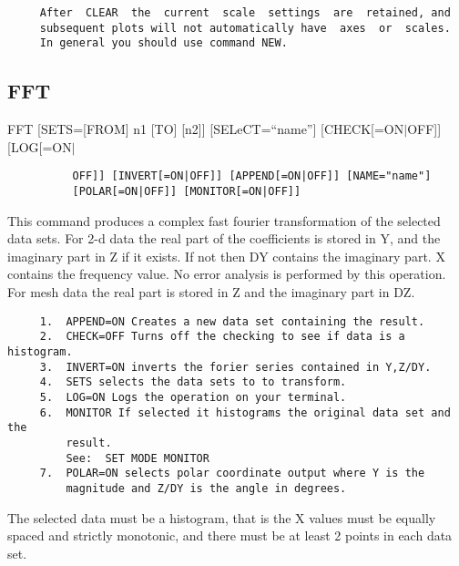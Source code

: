 \begin{verbatim}
     After  CLEAR  the  current  scale  settings  are  retained, and
     subsequent plots will not automatically have  axes  or  scales.
     In general you should use command NEW.  
\end{verbatim}


\subsection{FFT}
FFT [SETS=[FROM] n1 [TO] [n2]] [SELeCT=``name''] [CHECK[=ON$|$OFF]] [LOG[=ON$|$
\begin{verbatim}
          OFF]] [INVERT[=ON|OFF]] [APPEND[=ON|OFF]] [NAME="name"]
          [POLAR[=ON|OFF]] [MONITOR[=ON|OFF]] 
\end{verbatim}
This command produces a complex fast fourier transformation of the
selected data sets.  For 2-d data the real part of the coefficients is
stored in Y, and the imaginary part in Z if it exists.  If not then DY
contains the imaginary part.  X contains the frequency value.  No error
analysis is performed by this operation.  For mesh data the real part is
stored in Z and the imaginary part in DZ.  
\begin{verbatim}
     1.  APPEND=ON Creates a new data set containing the result.  
     2.  CHECK=OFF Turns off the checking to see if data is a histogram. 
     3.  INVERT=ON inverts the forier series contained in Y,Z/DY.  
     4.  SETS selects the data sets to to transform.  
     5.  LOG=ON Logs the operation on your terminal.  
     6.  MONITOR If selected it histograms the original data set and the
         result.  
         See:  SET MODE MONITOR 
     7.  POLAR=ON selects polar coordinate output where Y is the
         magnitude and Z/DY is the angle in degrees.  
\end{verbatim}

The selected data must be a histogram, that is the X values must be
equally spaced and strictly monotonic, and there must be at least 2
points in each data set.  
